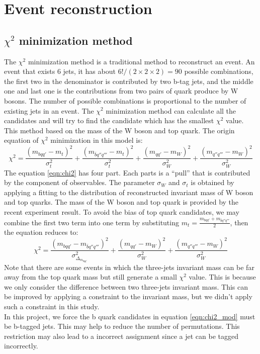 \section{Event reconstruction}\label{sec:Event reconstruction}
\subsection{$\chi^{2}$ minimization method}\label{subsec:chi-square}
The $\chi^{2}$ minimization method is a traditional method to reconstruct an event. An event that exists 6 jets, it has about $6!/(2\times2\times2)=90$ possible combinations, the first two in the denominator is contributed by two b-tag jets, and the middle one and last one is the contributions from two pairs of quark produce by W bosons. The number of possible combinations is proportional to the number of existing jets in an event. The $\chi^{2}$ minimization method can calculate all the candidates and will try to find the candidate which has the smallest $\chi^{2}$ value. This method based on the mass of the W boson and top quark. The origin equation of $\chi^{2}$ minimization in this model is:
\begin{equation}\label{eqn:chi2}
	\chi^{2} = \frac{( m_{bqq'} - m_{t} )^{2}}{\sigma_{t}^{2}} + \frac{( m_{\bar{b}q''q'''} - m_{t} )^{2}}{\sigma_{t}^{2}} + \frac{(m_{qq'} - m_{W})^{2}}{\sigma^{2}_{W}} + \frac{(m _{q''q'''} - m_{W})^{2}}{\sigma^{2}_{W}}
\end{equation} 
The equation \ref{eqn:chi2} has four part. Each parts is a ``pull'' that is contributed by the component of observables. The parameter $\sigma_{W}$ and $\sigma_{t}$ is obtained by applying a fitting to the distribution of reconstructed invariant mass of W boson and top quarks. The mass of the W boson and top quark is provided by the recent experiment result. To avoid the bias of top quark candidates, we may combine the first two term into one term by substituting $m_{t}=\frac{m_{bqq'} + m_{\bar{b}q''q'''}}{2}$, then the equation reduces to: 
\begin{equation}\label{eqn:chi2_mod}
	\chi^{2} = \frac{(m_{bqq'} - m_{\bar{b}q''q'''})^{2}}{\sigma^{2}_{\Delta_{m_{bqq'}}}}  + \frac{(m_{qq'} - m_{W})^{2}}{\sigma^{2}_{W}} + \frac{(m _{q''q'''} - m_{W})^{2}}{\sigma^{2}_{W}}
\end{equation} 
Note that there are some events in which the three-jets invariant mass can be far away from the top quark mass but still generate a small $\chi^{2}$ value. This is because we only consider the difference between two three-jets invariant mass. This can be improved by applying a constraint to the invariant mass\cite{Mccarthy:2015ucy}, but we didn't apply such a constraint in this study. 
\\
In this project, we force the b quark candidates in equation \ref{eqn:chi2_mod} must be b-tagged jets. This may help to reduce the number of permutations. This restriction may also lead to a incorrect assignment since a jet can be tagged incorrectly.
